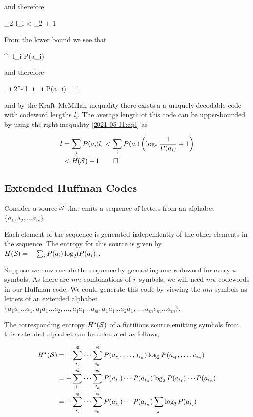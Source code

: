 and therefore

\be\label{2021-05-11:eq1}
\log_2  \leq l_i < \log_2  + 1
\ee

From the lower bound we see that

^{- l_i} \leq P(a_i)
\eee

and therefore

\bee
\sum_i 2^{- l_i} \leq \sum_i P(a_i) = 1
\eee

and by the Kraft–McMillan inequality there exists a a uniquely decodable code with codeword lengths $l_i$. The average length of this code can be upper-bounded by using the right inequality \eqref{2021-05-11:eq1} as

\begin{align*}
    \bar{l} &= \sum_i P(a_i) l_i < \sum_i P(a_i) \left( \log_2 \frac{1}{P(a_i)} + 1 \right) \\
    &< H(\mathcal{S}) + 1 \qed
\end{align*}


\subsection{Extended Huffman Codes}

Consider a source $\mathcal{S}$ that emits a sequence of letters from an alphabet $\{a_1, a_2, \ldots a_m \}$. 

Each element of the sequence is generated independently of the other elements in the sequence. The entropy for this source is given by $H(\mathcal{S}) = - \sum_i P(a_i) \log_2 (P(a_i))$.

Suppose we now encode the sequence by generating one codeword for every $n$ symbols. As there are $mn$ combinations of $n$ symbols, we will need $mn$ codewords in our Huffman code. We could generate this code by viewing the $mn$ symbols as letters of an extended alphabet $\{a_1 a_1 \ldots a_1 , a_1 a_1 \ldots a_2 , \ldots , a_1 a_1 \ldots a_m , a_1 a_1 \ldots a_2 a_1 , \ldots , a_m a_m \ldots a_m \}$.

The corresponding entropy $H^\star(\mathcal{S})$ of a fictitious source emitting symbols from this extended alphabet can be calculated as follows,

\begin{align*}
    H^\star(\mathcal{S}) &= - \sum_{i_1}^m \cdots \sum_{i_n}^m P(a_{i_1}, \ldots, a_{i_n}) \log_2 P(a_{i_1}, \ldots, a_{i_n}) \\
    &= - \sum_{i_1}^m \cdots \sum_{i_n}^m P(a_{i_1})  \cdots P(a_{i_n}) \log_2 P(a_{i_1}) \cdots P(a_{i_n}) \\
    &= - \sum_{i_1}^m \cdots \sum_{i_n}^m P(a_{i_1})  \cdots P(a_{i_n}) \sum_j \log_2 P(a_{i_j})
\end{align*}

